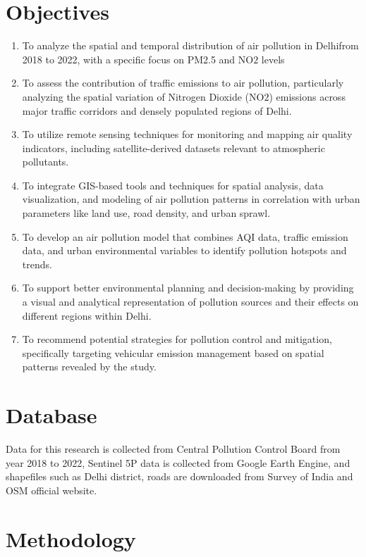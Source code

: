 \documentclass[12pt]{report}
\begin{document}
\chapter{Objectives}
\begin{enumerate}
    
    \item To analyze the spatial and temporal distribution of air pollution in Delhifrom 2018 to 2022, with a specific focus on PM2.5 and NO$2$ levels
    \item To assess the contribution of traffic emissions to air pollution, particularly analyzing the spatial variation of Nitrogen Dioxide (NO$2$) emissions across major traffic corridors and densely populated regions of Delhi.
    \item To utilize remote sensing techniques for monitoring and mapping air quality indicators, including satellite-derived datasets relevant to atmospheric pollutants.
    \item To integrate GIS-based tools and techniques for spatial analysis, data visualization, and modeling of air pollution patterns in correlation with urban parameters like land use, road density, and urban sprawl.
    \item To develop an air pollution model that combines AQI data, traffic emission data, and urban environmental variables to identify pollution hotspots and trends.
    \item To support better environmental planning and decision-making by providing a visual and analytical representation of pollution sources and their effects on different regions within Delhi.
    \item To recommend potential strategies for pollution control and mitigation, specifically targeting vehicular emission management based on spatial patterns revealed by the study.
    
\end{enumerate}

\chapter{Database}
Data for this research is collected from Central Pollution Control Board from year 2018 to 2022, Sentinel 5P data is collected from Google Earth Engine, and shapefiles such as Delhi district, roads are downloaded from Survey of India and OSM official website.

\chapter{Methodology}
\end{document}
